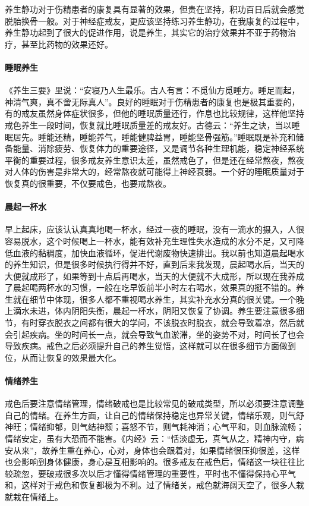 养生静功对于伤精患者的康复具有显著的效果，但贵在坚持，积功百日后就会感觉脱胎换骨一般。对于神经症戒友，更应该坚持练习养生静功，在我康复的过程中，养生静功起到了很大的促进作用，说是养生，其实它的治疗效果并不亚于药物治疗，甚至比药物的效果还好。

\paragraph{睡眠养生}

《养生三要》里说：“安寝乃人生最乐。古人有言：不觅仙方觅睡方。睡足而起，神清气爽，真不啻无际真人”。良好的睡眠对于伤精患者的康复也是极其重要的，有的戒友虽然身体症状很多，但他的睡眠质量还行，作息也比较规律，这样他坚持戒色养生一段时间，恢复就比睡眠质量差的戒友好。古德云：“养生之诀，当以睡眠居先。睡能还精，睡能养气，睡能健脾益胃，睡能坚骨强筋。”睡眠既是补充和储备能量、消除疲劳、恢复体力的重要途径，又是调节各种生理机能，稳定神经系统平衡的重要过程，很多戒友养生意识太差，虽然戒色了，但是还在经常熬夜，熬夜对人体的伤害是非常大的，经常熬夜就可能得上神经衰弱。一个好的睡眠质量对于恢复真的很重要，不仅要戒色，也要戒熬夜。

\paragraph{晨起一杯水}

早上起床，应该认认真真地喝一杯水，经过一夜的睡眠，没有一滴水的摄入，人很容易脱水，这个时候喝上一杯水，能有效补充生理性失水造成的水分不足，又可降低血液的黏稠度，加快血液循环，促进代谢废物快速排出。我以前也知道晨起喝水的养生知识，但是很多时候执行得并不好，直到后来我发现，晨起喝水后，当天的大便就成形了，如果等到十点后再喝水，当天的大便就不大成形，所以现在我养成了晨起喝两杯水的习惯，一般在吃早饭前半小时左右喝水，效果真的挺不错的。养生就在细节中体现，很多人都不重视喝水养生，其实补充水分真的很关键。一个晚上滴水未进，体内阴阳失衡，晨起一杯水，阴阳又恢复了协调。养生要注意很多细节，有时穿衣脱衣之间都有很大的学问，不该脱衣时脱衣，就会导致着凉，然后就会引起疾病。坐的时间长一点，就会导致气血淤滞，坐的姿势不对，时间长了也会导致疾病。戒色之后必须提升自己的养生觉悟，这样就可以在很多细节方面做到位，从而让恢复的效果最大化。

\paragraph{情绪养生}

戒色后要注意情绪管理，情绪破戒也是比较常见的破戒类型，所以必须要注意调整自己的情绪。在养生方面，让自己的情绪保持稳定也异常关键，情绪乐观，则气舒神旺；情绪抑郁，则气结神颓；喜怒不节，则气耗神消；心气平和，则血脉流畅；情绪安定，虽有大恐而不能害。《内经》云：“恬淡虚无，真气从之，精神内守，病安从来”，故养生重在养心，心对，身体也会跟着对，如果情绪很压抑很差，这样也会影响到身体健康，身心是互相影响的。很多戒友在戒色后，情绪这一块往往比较疏忽，要破戒很多次以后才懂得情绪管理的重要性，平时也不懂得保持心平气和，这样对于戒色和恢复都极为不利。过了情绪关，戒色就海阔天空了，很多人栽就栽在情绪上。

